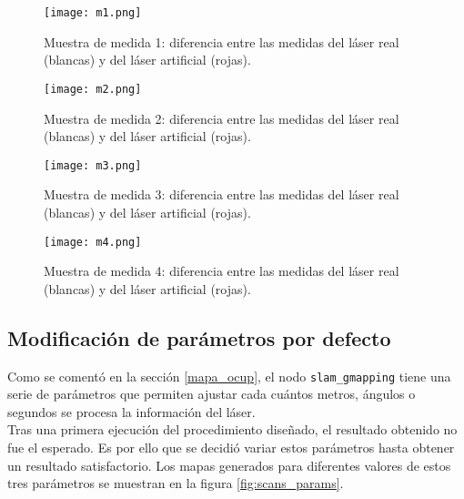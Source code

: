 \begin{figure}[H]
	\begin{center} 
		\texttt{[image: m1.png]}
	\end{center}
	\caption{Muestra de medida 1: diferencia entre las medidas del láser real (blancas) y del láser artificial (rojas).}
	\label{fig:m1}
\end{figure}

\begin{figure}[H]
	\begin{center} 
		\texttt{[image: m2.png]}
	\end{center}
	\caption{Muestra de medida 2: diferencia entre las medidas del láser real (blancas) y del láser artificial (rojas).}
	\label{fig:m2}
\end{figure}

\begin{figure}[H]
	\begin{center} 
		\texttt{[image: m3.png]}
	\end{center}
	\caption{Muestra de medida 3: diferencia entre las medidas del láser real (blancas) y del láser artificial (rojas).}
	\label{fig:m3}
\end{figure}

\begin{figure}[H]
	\begin{center} 
		\texttt{[image: m4.png]}
	\end{center}
	\caption{Muestra de medida 4: diferencia entre las medidas del láser real (blancas) y del láser artificial (rojas).}
	\label{fig:m4}
\end{figure}

\subsection{Modificación de parámetros por defecto}

Como se comentó en la sección \ref{mapa_ocup}, el nodo \texttt{slam\_gmapping} tiene una serie de parámetros que permiten ajustar cada cuántos metros, ángulos o segundos se procesa la información del láser.\\

Tras una primera ejecución del procedimiento diseñado, el resultado obtenido no fue el esperado. Es por ello que se decidió variar estos parámetros hasta obtener un resultado satisfactorio. Los mapas generados para diferentes valores de estos tres parámetros se muestran en la figura \ref{fig:scans_params}.\\

